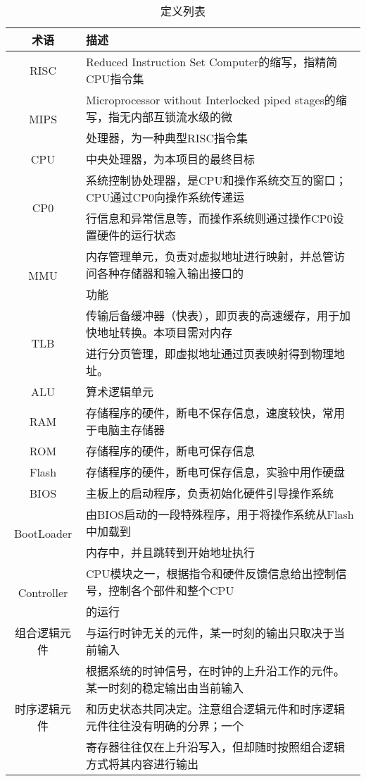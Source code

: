 \begin{table}[H]
	\centering
	\caption{定义列表}
	\begin{tabular}{|c|l|}
		\hline
		术语 & 描述 \\
		\hline
		RISC & Reduced Instruction Set Computer的缩写，指精简CPU指令集 \\
		\hline
		\multirow{2}{*}{MIPS} & Microprocessor without Interlocked piped stages的缩写，指无内部互锁流水级的微 \\
		& 处理器，为一种典型RISC指令集 \\
		\hline
		CPU & 中央处理器，为本项目的最终目标 \\
		\hline
		\multirow{2}{*}{CP0} & 系统控制协处理器，是CPU和操作系统交互的窗口；CPU通过CP0向操作系统传递运 \\
		& 行信息和异常信息等，而操作系统则通过操作CP0设置硬件的运行状态 \\
		\hline
		\multirow{2}{*}{MMU} & 内存管理单元，负责对虚拟地址进行映射，并总管访问各种存储器和输入输出接口的 \\
		& 功能 \\
		\hline
		\multirow{2}{*}{TLB} & 传输后备缓冲器（快表），即页表的高速缓存，用于加快地址转换。本项目需对内存 \\
		& 进行分页管理，即虚拟地址通过页表映射得到物理地址。 \\
		\hline
		ALU & 算术逻辑单元 \\
		\hline
		RAM & 存储程序的硬件，断电不保存信息，速度较快，常用于电脑主存储器 \\
		\hline
		ROM & 存储程序的硬件，断电可保存信息 \\
		\hline
		Flash & 存储程序的硬件，断电可保存信息，实验中用作硬盘 \\
		\hline
		BIOS & 主板上的启动程序，负责初始化硬件引导操作系统 \\
		\hline
		\multirow{2}{*}{BootLoader} & 由BIOS启动的一段特殊程序，用于将操作系统从Flash中加载到 \\
		& 内存中，并且跳转到开始地址执行 \\
		\hline
		\multirow{2}{*}{Controller} & CPU模块之一，根据指令和硬件反馈信息给出控制信号，控制各个部件和整个CPU \\
		& 的运行 \\
		\hline
		组合逻辑元件 & 与运行时钟无关的元件，某一时刻的输出只取决于当前输入 \\
		\hline
		\multirow{3}{*}{时序逻辑元件} & 根据系统的时钟信号，在时钟的上升沿工作的元件。某一时刻的稳定输出由当前输入 \\
		& 和历史状态共同决定。注意组合逻辑元件和时序逻辑元件往往没有明确的分界；一个 \\
		& 寄存器往往仅在上升沿写入，但却随时按照组合逻辑方式将其内容进行输出\\
		\hline
	\end{tabular}
\end{table}
